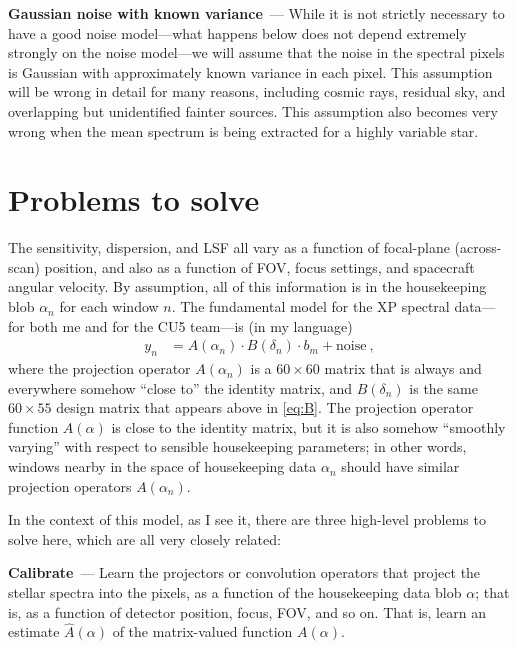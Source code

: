 \documentclass[11pt]{article}
\renewcommand{\paragraph}[1]{\medskip\par\noindent\textbf{#1}~---}
\begin{document}
\paragraph{Gaussian noise with known variance}
While it is not strictly necessary to have a good noise model---what happens below does not depend extremely strongly on the noise model---we will assume that the noise in the spectral pixels is Gaussian with approximately known variance in each pixel.
This assumption will be wrong in detail for many reasons, including cosmic rays, residual sky, and overlapping but unidentified fainter sources.
This assumption also becomes very wrong when the mean spectrum is being extracted for a highly variable star.

\section{Problems to solve}

The sensitivity, dispersion, and LSF all vary as a function of focal-plane (across-scan) position, and also as a function of FOV, focus settings, and spacecraft angular velocity.
By assumption, all of this information is in the housekeeping blob $\alpha_n$ for each window $n$.
The fundamental model for the XP spectral data---for both me and for the CU5 team---is (in my language)
\begin{align}
    y_n &= A(\alpha_n)\cdot B(\delta_n)\cdot b_m + \mbox{noise} ~,\label{eq:A}
\end{align}
where the projection operator $A(\alpha_n)$ is a $60\times 60$ matrix that is always and everywhere somehow ``close to'' the identity matrix, and $B(\delta_n)$ is the same $60\times 55$ design matrix that appears above in \eqref{eq:B}.
The projection operator function $A(\alpha)$ is close to the identity matrix, but it is also somehow ``smoothly varying'' with respect to sensible housekeeping parameters; in other words, windows nearby in the space of housekeeping data $\alpha_n$ should have similar projection operators $A(\alpha_n)$.

In the context of this model, as I see it, there are three high-level problems to solve here, which are all very closely related:

\paragraph{Calibrate}
Learn the projectors or convolution operators that project the stellar spectra into the pixels, as a function of the housekeeping data blob $\alpha$; that is, as a function of detector position, focus, FOV, and so on.
That is, learn an estimate $\hat{A}(\alpha)$ of the matrix-valued function $A(\alpha)$.
\end{document}
